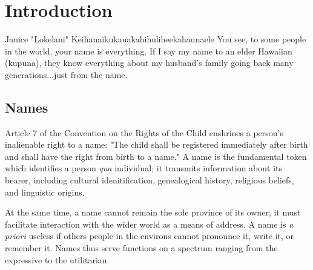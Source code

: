 \section{Introduction}

\begin{aquote}{Janice "Lokelani" Keihanaikukauakahihuliheekahaunaele}
You see, to some people in the world, your name is everything. If I say my name
to an elder Hawaiian (kupuna), they know everything about my husband's family
going back many generations...just from the name.
\end{aquote}

\subsection{Names}

Article 7 of the Convention on the Rights of the Child enshrines a person's
inalienable right to a name: "The child shall be registered immediately after
birth and shall have the right from birth to a name." \parencite{crc} A name is
the fundamental token which identifies a person \textit{qua} individual; it
transmits information about its bearer, including cultural idenitification,
genealogical history, religious beliefs, and linguistic origins.

At the same time, a name cannot remain the sole province of its owner; it must
facilitate interaction with the wider world as a means of address. A name is
\textit{a priori} useless if others people in the environs cannot pronounce it,
write it, or remember it. Names thus serve functions on a spectrum ranging from
the expressive to the utilitarian.

